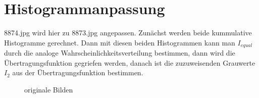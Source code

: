 \documentclass[12pt]{article}
\begin{document}
\section{Histogrammanpassung}
8874.jpg wird hier zu 8873.jpg angepassen. Zunächst werden beide kummulative Histogramme gerechnet. Dann mit diesen beiden Histogrammen kann man $I_{equal}$ durch die analoge Wahrscheinlichkeitsverteilung bestimmen, dann wird die Übertragungsfunktion gegriefen werden, danach ist die zuzuweisenden Grauwerte $I_2$ aus der Übertragungsfunktion bestimmen. 
\begin{figure}[ht]\centering
	\caption{originale Bilden}
\end{figure}
\end{document}

